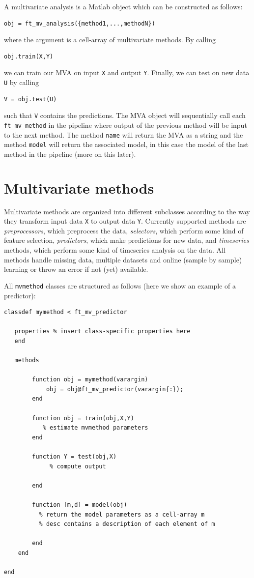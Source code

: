 \documentclass{article}
\renewcommand{\t}[1]{{\tt #1}}
\begin{document}
A multivariate analysis is a Matlab object which can be constructed as follows:
\begin{verbatim}
obj = ft_mv_analysis({method1,...,methodN})
\end{verbatim}
where the argument is a cell-array of multivariate methods. By calling
\begin{verbatim}
obj.train(X,Y)
\end{verbatim}
we can train our MVA on input \t{X} and output \t{Y}. Finally, we can test on new data \t{U} by calling
\begin{verbatim}
V = obj.test(U)
\end{verbatim}
such that \t{V} contains the predictions. The MVA object will sequentially call each \t{ft\_mv\_method} in the pipeline where output of the previous method will be input to the next method. The method \t{name} will return the MVA as a string and the method \t{model} will return the associated model, in this case the model of the last method in the pipeline (more on this later).


\section{Multivariate methods}

Multivariate methods are organized into different subclasses according to the way they transform input data \t{X} to output data \t{Y}. Currently supported methods are {\em preprocessors}, which preprocess the data, {\em selectors}, which perform some kind of feature selection, {\em predictors}, which make predictions for new data, and {\em timeseries} methods, which perform some kind of timeseries analysis on the data. All methods handle missing data, multiple datasets and online (sample by sample) learning or throw an error if not (yet) available.

All \t{mvmethod} classes are structured as follows (here we show an example of a predictor):
\begin{verbatim}
classdef mymethod < ft_mv_predictor
 
   properties % insert class-specific properties here
   end
 
   methods
 
        function obj = mymethod(varargin)       
         	obj = obj@ft_mv_predictor(varargin{:});
        end        
 
        function obj = train(obj,X,Y)
           % estimate mvmethod parameters
        end
 
        function Y = test(obj,X)
        	 % compute output
     
        end
 
        function [m,d] = model(obj)
          % return the model parameters as a cell-array m
          % desc contains a description of each element of m
 
        end
    end
 
end
\end{verbatim}
\end{document}
